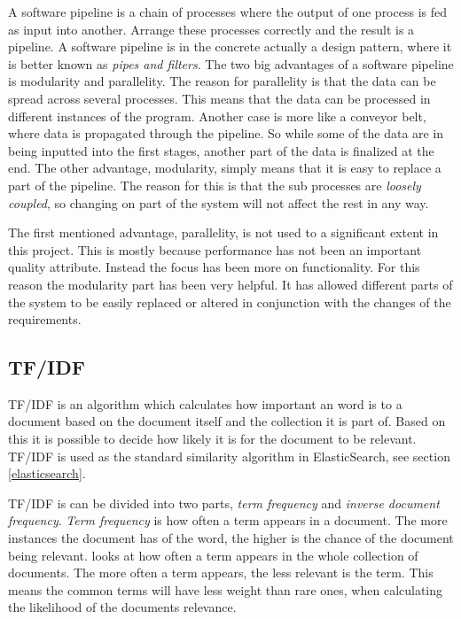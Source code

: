 A software pipeline is a chain of processes where the output of one process is fed as input into another. Arrange these processes correctly and the result is a pipeline. A software pipeline is in the concrete actually a design pattern, where it is better known as \textit{pipes and filters}\cite{pipes-and-filters}. The two big advantages of a software pipeline is modularity and parallelity\cite{dart}. The reason for parallelity is that the data can be spread across several processes. This means that the data can be processed in different instances of the program. Another case is more like a conveyor belt, where data is propagated through the pipeline. So while some of the data are in being inputted into the first stages, another part of the data is finalized at the end. The other advantage, modularity, simply means that it is easy to replace a part of the pipeline. The reason for this is that the sub processes are \textit{loosely coupled}, so changing on part of the system will not affect the rest in any way.

The first mentioned advantage, parallelity, is not used to a significant extent in this project. This is mostly because performance has not been an important quality attribute. Instead the focus has been more on functionality. For this reason the modularity part has been very helpful. It has allowed different parts of the system to be easily replaced or altered in conjunction with the changes of the requirements.


\subsection{TF/IDF} \label{tf/idf}
TF/IDF is an algorithm which calculates how important an word is to a document based on the document itself and the collection it is part of. Based on this it is possible to decide how likely it is for the document to be relevant. TF/IDF is used as the standard similarity algorithm in ElasticSearch, see section \ref{elasticsearch}.

TF/IDF is can be divided into two parts, \textit{term frequency} and \textit{inverse document frequency}. \textit{Term frequency} is how often a term appears in a document. The more instances the document has of the word, the higher is the chance of the document being relevant.  looks at how often a term appears in the whole collection of documents. The more often a term appears, the less relevant is the term. This means the common terms will have less weight than rare ones, when calculating the likelihood of the documents relevance. 

\cleardoublepage
